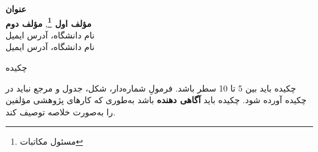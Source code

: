 \documentclass[a0,12pt,portrait]{a0poster}
\numberwithin{equation}{section}
\begin{document}
 \BgThispage
  \vspace{.5cm}

\begin{center}
\Huge \textbf{عنوان}\\[0.5cm]  %
\huge \textbf{مؤلف اول \footnote{\LARGE مسئول مکاتبات}},
\textbf{مؤلف دوم }\\[0.5cm]
  {\LARGE نام دانشگاه، آدرس ایمیل}
 \\{\LARGE   نام دانشگاه، آدرس ایمیل}\\[0.6cm] 
\end{center}
\vspace{1cm} %
\begin{center}
{\huge چکیده }
\end{center}
\huge
     چکیده باید بین 5 تا 10 سطر باشد. فرمولِ شماره‌دار، شکل، جدول و مرجع
      نباید در چکیده آورده شود. چکیده باید {\bf آگاهی دهنده} باشد به‌طوری که کارهای پژوهشی مؤلفین را به‌صورت خلاصه توصیف کند. 
\end{document}
